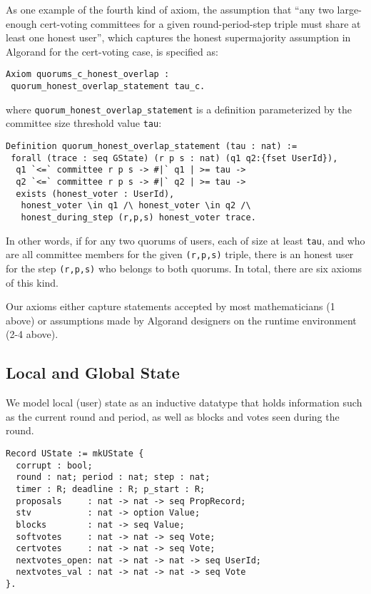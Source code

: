 As one example of the fourth kind of axiom, the assumption that ``any two large-enough cert-voting committees for a given round-period-step triple must share at least one honest user'', which captures the honest supermajority assumption in Algorand for the cert-voting case, is specified as:
\begin{lstlisting}[language=Coq]
Axiom quorums_c_honest_overlap :
 quorum_honest_overlap_statement tau_c.
\end{lstlisting}
where \lstinline{quorum_honest_overlap_statement} is a definition parameterized by the committee size threshold value \lstinline{tau}:
\begin{lstlisting}[language=Coq]
Definition quorum_honest_overlap_statement (tau : nat) :=
 forall (trace : seq GState) (r p s : nat) (q1 q2:{fset UserId}),
  q1 `<=` committee r p s -> #|` q1 | >= tau ->					
  q2 `<=` committee r p s -> #|` q2 | >= tau ->					
  exists (honest_voter : UserId),
   honest_voter \in q1 /\ honest_voter \in q2 /\
   honest_during_step (r,p,s) honest_voter trace.
\end{lstlisting}
In other words, if for any two quorums of users, each of size at least \lstinline{tau}, and who are all committee members for the given \lstinline{(r,p,s)} triple, there is an honest user for the step \lstinline{(r,p,s)} who belongs to both quorums. In total, there are six axioms of this kind.

Our axioms either capture statements accepted by most mathematicians (1 above) or assumptions made by Algorand designers on the runtime environment (2-4 above).

\subsection{Local and Global State}

We model local (user) state as an inductive datatype that holds information such as the current round and period, as well as blocks and votes seen during the round.

\begin{lstlisting}[language=Coq]
Record UState := mkUState {
  corrupt : bool;
  round : nat; period : nat; step : nat;
  timer : R; deadline : R; p_start : R;
  proposals     : nat -> nat -> seq PropRecord;
  stv           : nat -> option Value;
  blocks        : nat -> seq Value;
  softvotes     : nat -> nat -> seq Vote;
  certvotes     : nat -> nat -> seq Vote;
  nextvotes_open: nat -> nat -> nat -> seq UserId;
  nextvotes_val : nat -> nat -> nat -> seq Vote
}.
\end{lstlisting}


